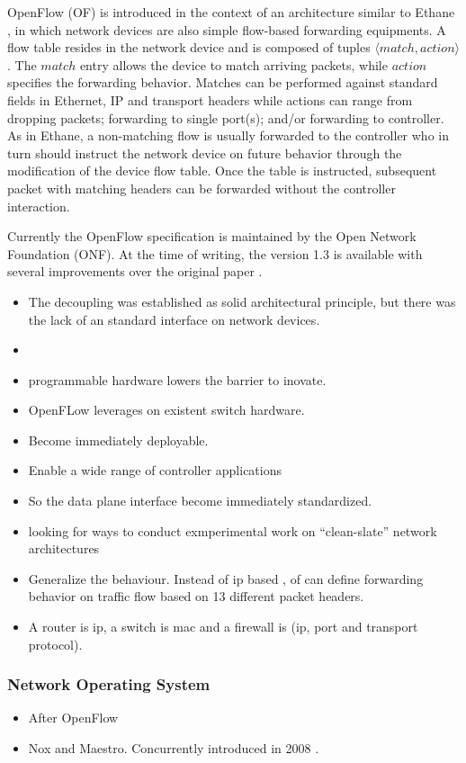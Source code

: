 \begin{itemize}
OpenFlow (OF) is introduced in the context of an architecture similar to
Ethane \cite{Casado:2007kb}, in which network devices 
are also simple flow-based forwarding equipments. A flow
table resides in the network device and is composed of tuples
$\langle match,action \rangle$. The $match$ entry allows the device to match
arriving packets, while  $action$
specifies the forwarding behavior. Matches can be performed against
standard fields in Ethernet, IP and transport headers while actions can
range from dropping packets; forwarding to single port(s); and/or forwarding to controller. As in Ethane, a non-matching flow is usually forwarded to the controller who in
turn should instruct  the network device on future behavior through
the modification of the device flow table. Once the table is instructed, 
subsequent packet with matching headers can be forwarded without
the controller interaction. 

Currently the OpenFlow specification is maintained by the Open Network
Foundation (ONF). At the time of writing, the version 1.3 \cite{of13} is available with
several improvements over the original paper \cite{openflow}. 

\begin{itemize}
\item The decoupling was established as solid architectural principle, but there was the lack of an standard interface on network devices. 
\item 
\item programmable hardware lowers the barrier to inovate. 
\item OpenFLow leverages on existent switch hardware. 
\item Become immediately deployable. 
\item  Enable a wide range of controller applications
\item So the data plane interface become immediately standardized. 
\item looking for ways to conduct exmperimental work on ``clean-slate'' network architectures 
\item Generalize the behaviour. Instead of ip based , \gls{of} can define forwarding behavior on traffic flow based on 13 different packet headers. 
\item A router is ip, a switch is mac and a firewall is (ip, port and transport protocol). 
\end{itemize}
\subsubsection{Network Operating System}
\begin{itemize}
\item After \gls{OpenFlow} 
\item Nox and Maestro. Concurrently introduced in 2008 . 


\end{itemize}
\end{itemize}
